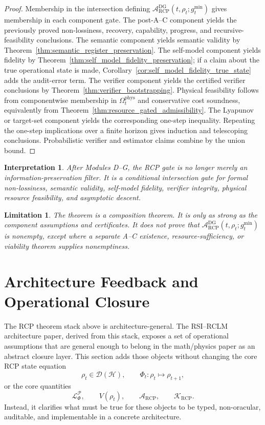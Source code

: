\documentclass[11pt]{article}
\newtheorem{interpretation}[theorem]{Interpretation}
\newtheorem{limitation}[theorem]{Limitation}
\newcommand{\D}{\mathcal{D}}
\newcommand{\Hcal}{\mathcal{H}}
\newcommand{\Acal}{\mathcal{A}}
\newcommand{\Pcal}{\mathcal{P}}
\newcommand{\Lcal}{\mathcal{L}}
\newcommand{\1}{\mathbf{1}}
\newcommand{\RCP}{\mathrm{RCP}}
\providecommand{\Kcal}{\mathcal{K}}
\providecommand{\DG}{\mathrm{DG}}
\providecommand{\phys}{\mathrm{phys}}
\begin{document}
\begin{proof}
Membership in the intersection defining \(\Acal_{\RCP}^{\DG}(t,\rho_t;g_t^{\min})\) gives membership in each component gate.  The post-A--C component yields the previously proved non-lossiness, recovery, capability, progress, and recursive-feasibility conclusions.  The semantic component yields semantic validity by Theorem~\ref{thm:semantic_register_preservation}.  The self-model component yields fidelity by Theorem~\ref{thm:self_model_fidelity_preservation}; if a claim about the true operational state is made, Corollary~\ref{cor:self_model_fidelity_true_state} adds the audit-error term.  The verifier component yields the certified verifier conclusions by Theorem~\ref{thm:verifier_bootstrapping}.  Physical feasibility follows from componentwise membership in \(\Omega_t^{\phys}\) and conservative cost soundness, equivalently from Theorem~\ref{thm:resource_gated_admissibility}.  The Lyapunov or target-set component yields the corresponding one-step inequality.  Repeating the one-step implications over a finite horizon gives induction and telescoping conclusions.  Probabilistic verifier and estimator claims combine by the union bound.
\end{proof}

\begin{interpretation}
After Modules D--G, the RCP gate is no longer merely an information-preservation filter.  It is a conditional intersection gate for formal non-lossiness, semantic validity, self-model fidelity, verifier integrity, physical resource feasibility, and asymptotic descent.
\end{interpretation}

\begin{limitation}
The theorem is a composition theorem.  It is only as strong as the component assumptions and certificates.  It does not prove that \(\Acal_{\RCP}^{\DG}(t,\rho_t;g_t^{\min})\) is nonempty, except where a separate A--C existence, resource-sufficiency, or viability theorem supplies nonemptiness.
\end{limitation}

\section{Architecture Feedback and Operational Closure}
\label{sec:operational_closure}

The RCP theorem stack above is architecture-general.  The RSI--RCLM architecture paper, derived from this stack, exposes a set of operational assumptions that are general enough to belong in the math/physics paper as an abstract closure layer.  This section adds those objects without changing the core RCP state equation
\[
\rho_t\in\D(\Hcal),
\qquad
\Phi_t:\rho_t\mapsto\rho_{t+1},
\]
or the core quantities
\[
\Lcal_{\Phi}^{\Pcal},
\qquad
V(\rho_t),
\qquad
\Acal_{\RCP},
\qquad
\Kcal_{\RCP}.
\]
Instead, it clarifies what must be true for these objects to be typed, non-oracular, auditable, and implementable in a concrete architecture.
\end{document}
